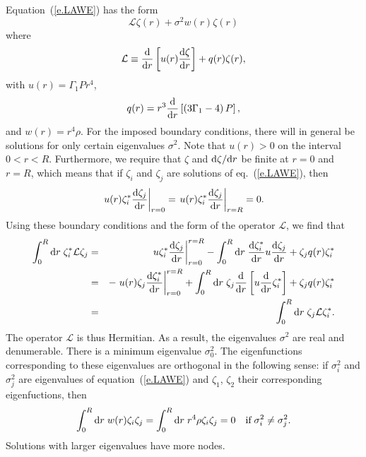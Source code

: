 Equation~(\ref{e.LAWE}) has the form
\[
\mathcal{L}\zeta(r) + \sigma^{2} w(r) \zeta(r)
\]
where
\[
\mathcal{L} \equiv \frac{\mathrm{d}}{\mathrm{d} r}\left[ u(r) \frac{\mathrm{d} \zeta}{\mathrm{d} r}\right] + q(r)\zeta(r),
\]
with $u(r) = \Gamma_{1} P r^{4}$,
\[ q(r) = r^{3}\frac{\mathrm{d}}{\mathrm{d} r}\left[\left( 3\Gamma_{1}-4\right)P\right], \]
and $w(r) = r^{4}\rho$.  For the imposed boundary conditions, there will in general be solutions for only certain eigenvalues $\sigma^{2}$.  Note that $u(r) > 0$ on the interval $0 < r < R$.  Furthermore, we require that $\zeta$ and $\mathrm{d} \zeta/\mathrm{d} r$ be finite at $r = 0$ and $r = R$, which means that if $\zeta_{i}$ and $\zeta_{j}$ are solutions of eq.~(\ref{e.LAWE}), then
\begin{equation}\label{e.LAWE-boundary}
\left . u(r) \zeta_{i}^{*}\frac{\mathrm{d}\zeta_{j}}{\mathrm{d} r} \right |_{r = 0} = \left . u(r) \zeta_{i}^{*}\frac{\mathrm{d}\zeta_{j}}{\mathrm{d} r} \right |_{r = R} = 0.
\end{equation}
Using these boundary conditions and the form of the operator $\mathcal{L}$, we find that
\begin{eqnarray*}
 \int_{0}^{R}\mathrm{d} r\; \zeta_{i}^{*} \mathcal{L}\zeta_{j} &=&  \left. u\zeta_{i}^{*}\frac{\mathrm{d}\zeta_{j}}{\mathrm{d} r}\right|_{r=0}^{r=R} -  \int_{0}^{R}\mathrm{d} r\; \frac{\mathrm{d}\zeta_{i}^{*}}{\mathrm{d} r} u \frac{\mathrm{d}\zeta_{j}}{\mathrm{d} r} + \zeta_{j}q(r)\zeta_{i}^{*}\\
  &=& -\left. u(r) \zeta_{j}\frac{\mathrm{d}\zeta_{i}^{*}}{\mathrm{d} r} \right|_{r=0}^{r=R} + \int_{0}^{R}\mathrm{d} r\; \zeta_{j}\frac{\mathrm{d}}{\mathrm{d} r}\left[u\frac{\mathrm{d}}{\mathrm{d} r}\zeta_{i}^{*}\right] + \zeta_{j}q(r)\zeta_{i}^{*} \\
   &=& \int_{0}^{R}\mathrm{d} r\; \zeta_{j}\mathcal{L}\zeta_{i}^{*}.
 \end{eqnarray*}
The operator $\mathcal{L}$ is thus Hermitian.  As a result, the eigenvalues $\sigma^{2}$ are real and denumerable.  There is a minimum eigenvalue $\sigma^{2}_{0}$.  The eigenfunctions corresponding to these eigenvalues are orthogonal in the following sense: if $\sigma^{2}_{i}$ and $\sigma_{j}^{2}$ are eigenvalues of equation~(\ref{e.LAWE}) and $\zeta_{1}$, $\zeta_{2}$ their corresponding eigenfuctions, then
\begin{equation}\label{e.LAWE-orthogonality}
\int_{0}^{R}\mathrm{d} r\; w(r) \zeta_{i}\zeta_{j} = \int_{0}^{R} \mathrm{d} r\; r^{4}\rho \zeta_{i}\zeta_{j} = 0\quad \textrm{if} \;\sigma_{i}^{2} \neq \sigma_{j}^{2}.
\end{equation}
Solutions with larger eigenvalues have more nodes.

